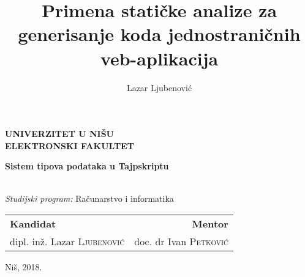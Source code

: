 \documentclass[twoside, openright]{article}
\title{Primena statičke analize za generisanje koda jednostraničnih veb-aplikacija}
\author{Lazar Ljubenović}
\makeatletter
\newcommand\frontmatter{%
    \cleardoublepage
  \pagenumbering{roman}}
\makeatother
\begin{document}
   
\begin{titlepage}
  \begin{center}

    \begin{minipage}[b]{0.7\textwidth}
        \centering
        \textbf{UNIVERZITET U NIŠU\\ELEKTRONSKI FAKULTET}
    \end{minipage}%
    
    \vspace{5cm}
    \LARGE
    \textbf{Sistem tipova podataka u Tajpskriptu}
    
    \vspace{1cm}
    \normalsize
    \\
    \vspace{.33cm}
    \textit{Studijski program:} Računarstvo i informatika
  \end{center}

  \vfill

  \noindent 
  \begin{tabularx}{\textwidth}{XR}
    \textbf{Kandidat}                    & \textbf{Mentor}                \\
    dipl. inž. Lazar \textsc{Ljubenović} & doc. dr Ivan \textsc{Petković}
  \end{tabularx}

  \vfill

  \begin{center}
    Niš, 2018.
  \end{center}
\end{titlepage}







\end{document}
